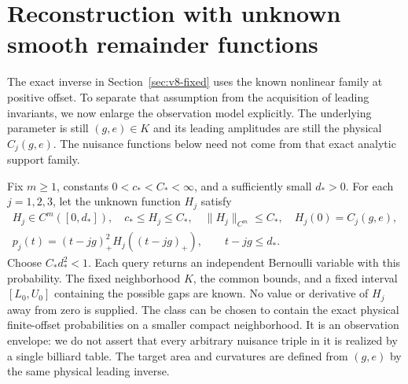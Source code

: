 \section{Reconstruction with unknown smooth remainder functions}
\label{sec:v8-nuisance}
The exact inverse in Section~\ref{sec:v8-fixed} uses the known nonlinear
family at positive offset. To separate that assumption from the
acquisition of leading invariants, we now enlarge the observation
model explicitly. The underlying parameter is still $(g,e)\in K$ and
its leading amplitudes are still the physical $C_j(g,e)$. The nuisance
functions below need not come from that exact analytic support family.

Fix $m\ge1$, constants $0<c_*<C_*<\infty$, and a sufficiently small
$d_*>0$. For each $j=1,2,3$, let the unknown function $H_j$ satisfy
\begin{equation}\label{eq:v8-envelope}
 \begin{gathered}
 H_j\in C^m([0,d_*]),\quad c_*\le H_j\le C_*,\quad
       \|H_j\|_{C^m}\le C_*,\quad H_j(0)=C_j(g,e),\\
 p_j(t)=(t-jg)_+^2H_j((t-jg)_+),\qquad t-jg\le d_*.
 \end{gathered}
\end{equation}
Choose $C_*d_*^2<1$. Each query returns an independent Bernoulli
variable with this probability. The fixed neighborhood $K$, the common
bounds, and a fixed interval $[L_0,U_0]$ containing the possible gaps
are known. No value or derivative of $H_j$ away from zero is supplied.
The class can be chosen to contain the exact physical finite-offset
probabilities on a smaller compact neighborhood. It is an observation
envelope: we do not assert that every arbitrary nuisance triple in it
is realized by a single billiard table. The target area and curvatures
are defined from $(g,e)$ by the same physical leading inverse.

